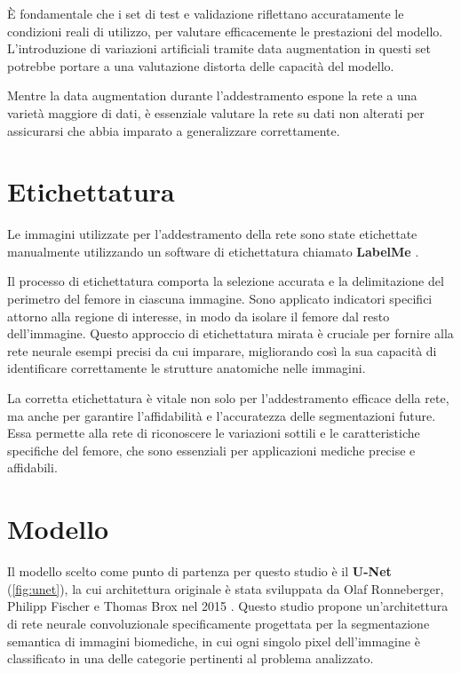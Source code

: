 È fondamentale che i set di test e validazione riflettano accuratamente le condizioni reali di
utilizzo, per valutare efficacemente le prestazioni del modello. L'introduzione di variazioni
artificiali tramite data augmentation in questi set potrebbe portare a una valutazione distorta
delle capacità del modello.

Mentre la data augmentation durante l'addestramento espone la rete a una varietà maggiore di dati, è
essenziale valutare la rete su dati non alterati per assicurarsi che abbia imparato a generalizzare
correttamente.



\section{Etichettatura}
Le immagini utilizzate per l'addestramento della rete sono state etichettate manualmente utilizzando
un software di etichettatura chiamato \textbf{LabelMe} \cite{labelme}.

Il processo di etichettatura comporta la selezione accurata e la delimitazione del perimetro del
femore in ciascuna immagine. Sono applicato indicatori specifici attorno alla regione di interesse,
in modo da isolare il femore dal resto dell'immagine. Questo approccio di etichettatura mirata è
cruciale per fornire alla rete neurale esempi precisi da cui imparare, migliorando così la sua
capacità di identificare correttamente le strutture anatomiche nelle immagini.

La corretta etichettatura è vitale non solo per l'addestramento efficace della rete, ma anche per
garantire l'affidabilità e l'accuratezza delle segmentazioni future. Essa permette alla rete di
riconoscere le variazioni sottili e le caratteristiche specifiche del femore, che sono essenziali
per applicazioni mediche precise e affidabili.




\section{Modello}

Il modello scelto come punto di partenza per questo studio è il \textbf{U-Net} (\autoref{fig:unet}),
la cui architettura originale è stata sviluppata da Olaf Ronneberger, Philipp Fischer e Thomas Brox
nel 2015 \cite{ronneberger2015unet}. Questo studio propone un'architettura di rete neurale
convoluzionale specificamente progettata per la segmentazione semantica di immagini biomediche, in
cui ogni singolo pixel dell'immagine è classificato in una delle categorie pertinenti al problema
analizzato.

